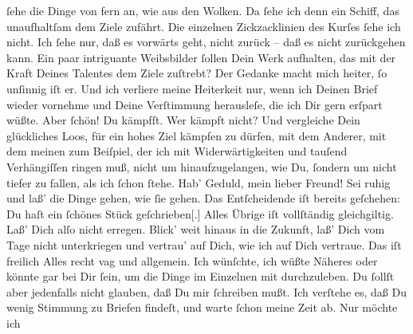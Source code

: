\begin{ledgroupsized}[t]{13cm}
               ſehe die Dinge von fern an, wie aus den Wolken. Da ſehe ich denn ein Schiff, das
               unaufhaltſam dem Ziele zufährt. Die einzelnen Zickzacklinien des Kurſes ſehe ich
               nicht. Ich ſehe nur, daß es vorwärts geht, nicht zurück – daß es nicht zurückgehen
               kann. Ein paar intriguante Weibsbilder ſollen Dein Werk aufhalten, das mit der Kraft Deines Talentes dem Ziele zuſtrebt? Der Gedanke
               macht mich heiter, ſo unſinnig iſt er. {\pb}Und ich
               verliere meine Heiterkeit nur, wenn ich Deinen Brief wieder vornehme und Deine
               Verſtimmung herausleſe, die ich Dir gern erſpart wüßte. Aber ſchön! Du kämpfſt. Wer
               kämpft nicht? Und vergleiche Dein glückliches Loos, für ein hohes Ziel kämpfen zu
               dürfen, mit dem Anderer, mit dem meinen zum Beiſpiel, der ich mit Widerwärtigkeiten
               und tauſend Verhängiſſen ringen muß, nicht um hinaufzugelangen, wie Du, ſondern um
               nicht tiefer zu fallen, als ich ſchon ſtehe.\pend
           \pstart
           {\pb}Hab’ Geduld, mein lieber Freund! Sei ruhig und laß’
               die Dinge gehen, wie ſie gehen. Das Entſcheidende iſt bereits geſchehen: Du haſt ein
               ſchönes Stück
                  geſchrieben{[}.{]} Alles Übrige iſt vollſtändig gleichgiltig.  Laß’ Dich alſo nicht erregen. Blick’ weit hinaus in die Zukunft, laß’ Dich vom
               Tage nicht unterkriegen und vertrau’ auf Dich, wie ich auf Dich vertraue.\pend
           \pstart
           Das iſt freilich Alles recht vag und allgemein. Ich wünſchte, ich wüßte  Näheres oder könnte gar bei Dir ſein, um {\pb}die Dinge im Einzelnen mit durchzuleben. Du ſollſt
               aber jedenfalls nicht glauben, daß Du mir ſchreiben mußt. Ich verſtehe es, daß Du
               wenig Stimmung zu Briefen findeſt, und warte ſchon meine Zeit ab. Nur möchte ich

\end{ledgroupsized}
